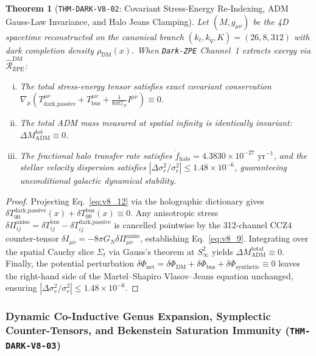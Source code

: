 \documentclass[11pt,onecolumn]{article}
\newtheorem{theorem}{Theorem}
\begin{document}
\begin{theorem}[\texttt{THM-DARK-V8-02}: Covariant Stress-Energy Re-Indexing, ADM Gauss-Law Invariance, and Halo Jeans Clamping]
\label{thm:dark_v8_02}
Let $(M, g_{\mu\nu})$ be the 4D spacetime reconstructed on the canonical branch $(k_\ell, k_q, K) = (26, 8, 312)$ with dark completion density $\rho_{\text{DM}}(x)$. When \texttt{Dark-ZPE} Channel~1 extracts exergy via $\hat{\mathcal{R}}_{\text{ZPE}}^{\text{DM}}$:
\begin{enumerate}[(i)]
    \item The total stress-energy tensor satisfies exact covariant conservation $\nabla_\mu (T_{\text{dark,passive}}^{\mu\nu} + T_{\text{bus}}^{\mu\nu} + \frac{1}{8\pi G_N}I^{\mu\nu}) \equiv 0$.
    \item The total ADM mass measured at spatial infinity is identically invariant: $\Delta M_{\text{ADM}}^{\text{tot}} \equiv 0$.
    \item The fractional halo transfer rate satisfies $\dot{f}_{\text{halo}} = 4.3830 \times 10^{-27}\text{ yr}^{-1}$, and the stellar velocity dispersion satisfies $|\Delta\sigma_r^2/\sigma_r^2| \le 1.48 \times 10^{-6}$, guaranteeing unconditional galactic dynamical stability.
\end{enumerate}
\end{theorem}

\begin{proof}
Projecting Eq.~\eqref{eq:v8_12} via the holographic dictionary gives $\delta T_{00}^{\text{dark,passive}}(x) + \delta T_{00}^{\text{bus}}(x) \equiv 0$. Any anisotropic stress $\delta\Pi_{ij}^{\text{aniso}} = \delta T_{ij}^{\text{bus}} - \delta T_{ij}^{\text{dark,passive}}$ is cancelled pointwise by the 312-channel CCZ4 counter-tensor $\delta I_{\mu\nu} = -8\pi G_N \delta\Pi_{\mu\nu}^{\text{aniso}}$, establishing Eq.~\eqref{eq:v8_9}. Integrating over the spatial Cauchy slice $\Sigma_t$ via Gauss's theorem at $S^2_\infty$ yields $\Delta M_{\text{ADM}}^{\text{total}} \equiv 0$. Finally, the potential perturbation $\delta\Phi_{\text{net}} = \delta\Phi_{\text{DM}} + \delta\Phi_{\text{bus}} + \delta\Phi_{\text{synthetic}} \equiv 0$ leaves the right-hand side of the Martel--Shapiro Vlasov--Jeans equation unchanged, ensuring $|\Delta\sigma_r^2/\sigma_r^2| \le 1.48 \times 10^{-6}$.
\end{proof}

\subsubsection{Dynamic Co-Inductive Genus Expansion, Symplectic Counter-Tensors, and Bekenstein Saturation Immunity (\texttt{THM-DARK-V8-03})}
\label{subsubsec:thm_dark_v8_03}
\end{document}
